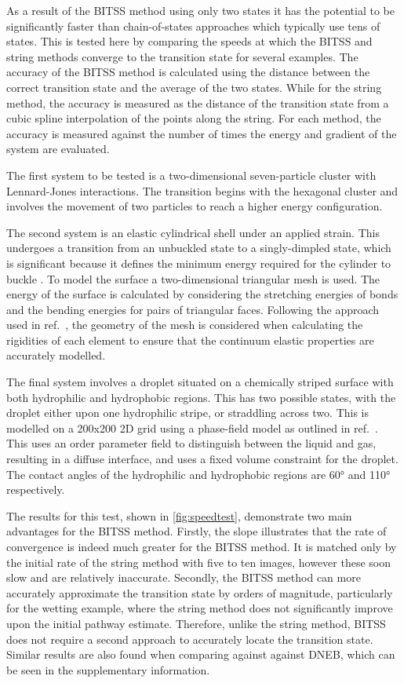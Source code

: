 \documentclass[aps,twocolumn]{revtex4}
\newcommand{\ccite}[1]{ref.~\cite{#1}}
\begin{document}
As a result of the BITSS method using only two states it has the potential to be significantly faster than chain-of-states approaches which typically use tens of states. This is tested here by comparing the speeds at which the BITSS and string methods converge to the transition state for several examples. The accuracy of the BITSS method is calculated using the distance between the correct transition state and the average of the two states. While for the string method, the accuracy is measured as the distance of the transition state from a cubic spline interpolation of the points along the string. For each method, the accuracy is measured against the number of times the energy and gradient of the system are evaluated.

The first system to be tested is a two-dimensional seven-particle cluster with Lennard-Jones interactions. The transition begins with the hexagonal cluster and involves the movement of two particles to reach a higher energy configuration.

The second system is an elastic cylindrical shell under an applied strain. This undergoes a transition from an unbuckled state to a singly-dimpled state, which is significant because it defines the minimum energy required for the cylinder to buckle \cite{Panter2019}. To model the surface a two-dimensional triangular mesh is used. The energy of the surface is calculated by considering the stretching energies of bonds and the bending energies for pairs of triangular faces. Following the approach used in \ccite{Panter2019}, the geometry of the mesh is considered when calculating the rigidities of each element to ensure that the continuum elastic properties are accurately modelled.

The final system involves a droplet situated on a chemically striped surface with both hydrophilic and hydrophobic regions. This has two possible states, with the droplet either upon one hydrophilic stripe, or straddling across two. This is modelled on a 200x200 2D grid using a phase-field model as outlined in \ccite{Panter2019b}. This uses an order parameter field to distinguish between the liquid and gas, resulting in a diffuse interface, and uses a fixed volume constraint for the droplet. The contact angles of the hydrophilic and hydrophobic regions are 60\si{\degree} and 110\si{\degree} respectively.

The results for this test, shown in \cref{fig:speedtest}, demonstrate two main advantages for the BITSS method. Firstly, the slope illustrates that the rate of convergence is indeed much greater for the BITSS method. It is matched only by the initial rate of the string method with five to ten images, however these soon slow and are relatively inaccurate. Secondly, the BITSS method can more accurately approximate the transition state by orders of magnitude, particularly for the wetting example, where the string method does not significantly improve upon the initial pathway estimate. Therefore, unlike the string method, BITSS does not require a second approach to accurately locate the transition state. Similar results are also found when comparing against against DNEB, which can be seen in the supplementary information.
\end{document}
